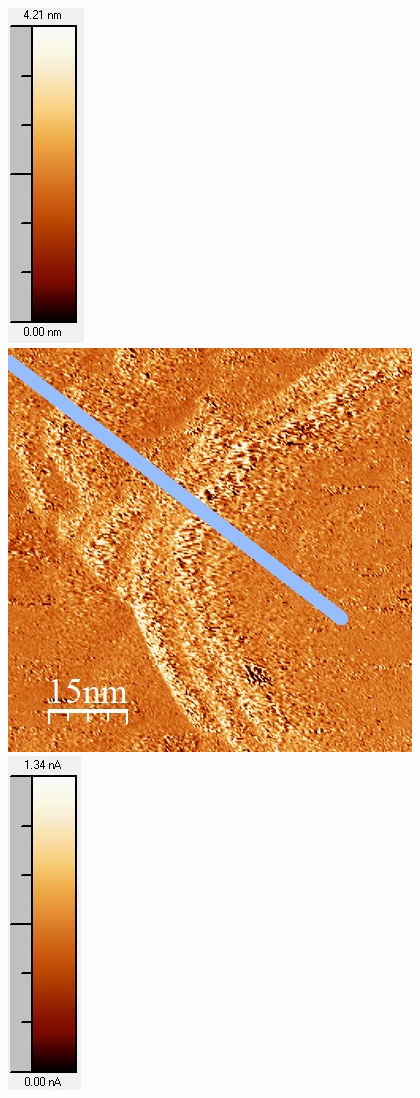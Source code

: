 \documentclass[12pt,a4paper]{article}
\begin{document}
\begin{figure}[H]
\includegraphics[scale=0.6]{Bilder/Anhang/IGain/3000_IGain_nach_Skala.jpg}
\includegraphics[scale=0.6]{Bilder/Anhang/IGain/Strom/3000_IGain_Strom_vor.jpg}
\includegraphics[scale=0.6]{Bilder/Anhang/IGain/Strom/3000_IGain_Strom_vor_Skala.jpg}

\end{figure}
\end{document}
